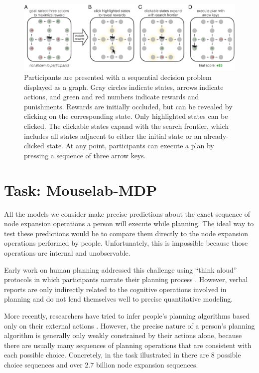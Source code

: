 \begin{figure}[t!]
    \centering
    \includegraphics[width=\textwidth]{figs/planning/fig2.pdf}
    \caption{
     Participants are presented with a sequential decision problem displayed as a graph. Gray circles indicate states, arrows indicate actions, and green and red numbers indicate rewards and punishments.
     Rewards are initially occluded, but can be revealed by clicking on the corresponding state. Only highlighted states can be clicked.
     The clickable states expand with the search frontier, which includes all states adjacent to either the initial state or an already-clicked state.
     At any point, participants can execute a plan by pressing a sequence of three arrow keys.}
    \label{fig:planning-task}
\end{figure}


\section{Task: Mouselab-MDP}\label{sec:planning-task}
All the models we consider make precise predictions about the exact sequence of node expansion operations a person will execute while planning. The ideal way to test these predictions would be to compare them directly to the node expansion operations performed by people. Unfortunately, this is impossible because those operations are internal and unobservable.

Early work on human planning addressed this challenge using ``think aloud'' protocols in which participants narrate their planning process \citep{degroot1965thought,newell1972human,chase1973perception}. However, verbal reports are only indirectly related to the cognitive operations involved in planning and do not lend themselves well to precise quantitative modeling.

More recently, researchers have tried to infer people's planning algorithms based only on their external actions \citep{huys2012bonsai,huys2015interplay,daw2005uncertaintybased,solway2015evidence,snider2015prospective,vanopheusden2017computational}. However, the precise nature of a person's planning algorithm is generally only weakly constrained by their actions alone, because there are usually many sequences of planning operations that are consistent with each possible choice. Concretely, in the task illustrated in  there are $8$ possible choice sequences and over $2.7$ billion node expansion sequences.

